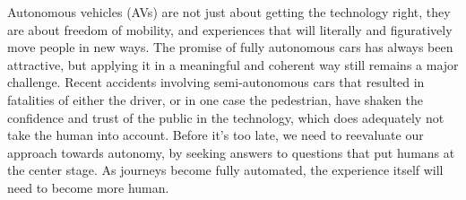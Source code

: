 

Autonomous vehicles (AVs) are not just about getting the technology right, they are about freedom of mobility, and experiences that will literally and figuratively move people in new ways.
The promise of fully autonomous cars has always been attractive, but applying it in a meaningful and coherent way still remains a major challenge. 
Recent accidents involving semi-autonomous cars that resulted in fatalities of either the driver, or in one case the pedestrian, have shaken the confidence and trust of the public in the technology, which does adequately not take the human into account.
Before it’s too late, we need to reevaluate our approach towards autonomy, by seeking answers to questions that put humans at the center stage. 
As journeys become fully automated, the experience itself will need to become more human. 

